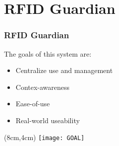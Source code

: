 \section{RFID Guardian}
\begin{frame}
 \frametitle{RFID Guardian}

 The goals of this system are:
 \begin{itemize}
  \item Centralize use and management
  \item Contex-awareness
  \item Ease-of-use
  \item Real-world useability
 \end{itemize}


 \begin{textblock*}{5cm}(8cm,4cm)
  \texttt{[image: GOAL]}
 \end{textblock*}

\end{frame}

